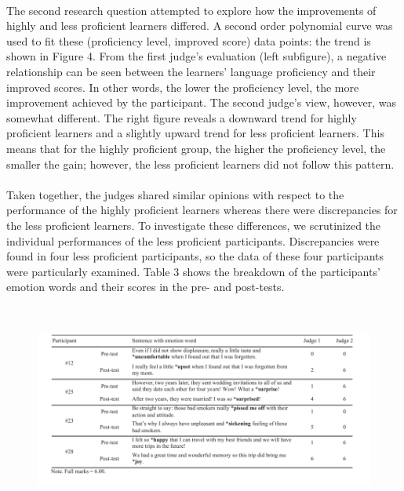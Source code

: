 \documentclass[a4paper,12pt,oneside]{article}
\begin{document}
\paragraph{}
The second research question attempted to explore how the improvements of highly and less proficient learners differed. A second order polynomial curve was used to fit these (proficiency level, improved score) data points: the trend is shown in Figure 4. From the first judge’s evaluation (left subfigure), a negative relationship can be seen between the learners’ language proficiency and their improved scores. In other words, the lower the proficiency level, the more improvement achieved by the participant. The second judge’s view, however, was somewhat different. The right figure reveals a downward trend for highly proficient learners and a slightly upward trend for less proficient learners. This means that for the highly proficient group, the higher the proficiency level, the smaller the gain; however, the less proficient learners did not follow this pattern. 
\paragraph{}
Taken together, the judges shared similar opinions with respect to the performance of the highly proficient learners whereas there were discrepancies for the less proficient learners. To investigate these differences, we scrutinized the individual performances of the less proficient participants. Discrepancies were found in four less proficient participants, so the data of these four participants were particularly examined. Table 3 shows the breakdown of the participants’ emotion words and their scores in the pre- and post-tests. 

\begin{figure}[H]
\includegraphics[height=7cm,width=16cm]{Table3.png}
\centering
\end{figure}
\end{document}
